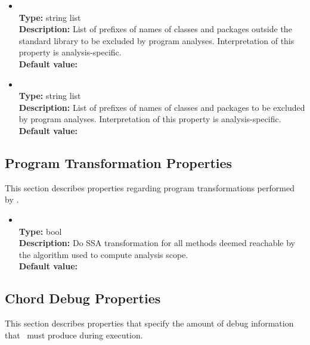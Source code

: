 \begin{itemize}
\item
{} \\
{\bf Type:} string list \\
{\bf Description:} List of prefixes of names of classes and packages outside the standard library to be excluded by program analyses.  Interpretation of this property is analysis-specific. \\
{\bf Default value:} 

\item
{} \\
{\bf Type:} string list \\
{\bf Description:} List of prefixes of names of classes and packages to be excluded by program analyses.  Interpretation of this property is analysis-specific. \\
{\bf Default value:} 
\end{itemize}

\subsection{Program Transformation Properties}

This section describes properties regarding program transformations performed by \Chord.

\begin{itemize}
\item
{} \\
{\bf Type:} bool \\
{\bf Description:} Do SSA transformation for all methods deemed reachable by the algorithm used to compute analysis scope. \\
{\bf Default value:}  
\end{itemize}

\subsection{Chord Debug Properties}

This section describes properties that specify the amount of debug information that \Chord\ must produce during execution.

